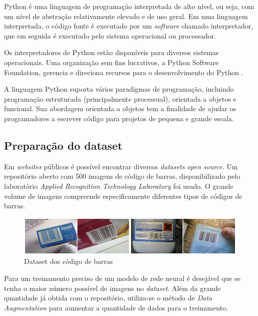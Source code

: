 Python é uma linguagem de programação interpretada de alto nível, ou seja, com um nível de abstração relativamente elevado e de uso geral. Em uma linguagem interpretada, o código fonte é executado por um \textit{software} chamado interpretador, que em seguida é executado pelo sistema operacional ou processador.

Os interpretadores de Python estão disponíveis para diversos sistemas operacionais. Uma organização sem fins lucrativos, a Python Software Foundation, gerencia e direciona recursos para o desenvolvimento do Python \cite{van2007python}.


A linguagem Python suporta vários paradigmas de programação, incluindo programação estruturada (principalmente processual), orientada a objetos e funcional. Sua abordagem orientada a objetos tem a finalidade de ajudar os programadores a escrever código para projetos de pequena e grande escala.


\subsection{Preparação do dataset}

Em \textit{websites} públicos é possível encontrar diversos \textit{datasets} \textit{open source}. Um repositório aberto com 500 imagens de código de barras, disponibilizado pelo laboratório \textit{Applied Recognition Technology Laboratory} foi usado. O grande volume de imagens compreende especificamente diferentes tipos de códigos de barras\cite{Arte-Lab}.

\begin{figure}[htbp]
	\centering
	\includegraphics[width=1\linewidth]{figuras/MachineLearning/barcodes.png}
	\caption{Dataset dos código de barras}
	\label{fig:datasetBarcode}
\end{figure}

Para um treinamento preciso de um modelo de rede neural é desejável que se tenha o maior número possível de imagens no \textit{dataset}. Além da grande quantidade já obtida com o repositório, utiliza-se o método de \textit{Data Augmentation} para aumentar a quantidade de dados para o treinamento.  

